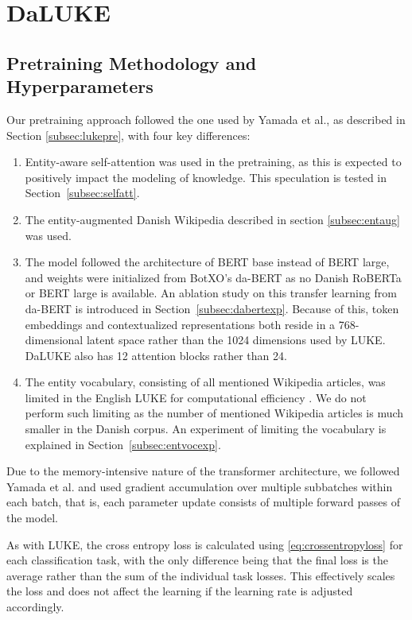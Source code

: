 \documentclass[main.tex]{subfiles}
\begin{document}
\section{DaLUKE}

\subsection{Pretraining Methodology and Hyperparameters}%
\label{sub:dalpre}
Our pretraining approach followed the one used by Yamada et al., as described in Section \ref{subsec:lukepre}, with four key differences:
\begin{enumerate}
    \item
        Entity-aware self-attention was used in the pretraining, as this is expected to positively impact the modeling of knowledge.
        This speculation is tested in Section~\ref{subsec:selfatt}.
    \item
        The entity-augmented Danish Wikipedia described in section \ref{subsec:entaug} was used.
    \item
        The model followed the architecture of BERT base instead of BERT large, and weights were initialized from BotXO's da-BERT \cite{botxo2019dabert} as no Danish RoBERTa or BERT large is available.
        An ablation study on this transfer learning from da-BERT is introduced in Section~\ref{subsec:dabertexp}.
        Because of this, token embeddings and contextualized representations both reside in a 768-dimensional latent space rather than the 1024 dimensions used by LUKE.
        DaLUKE also has 12 attention blocks rather than 24.
        \cite[Sec. 3.4]{yamada2020luke}
    \item
        The entity vocabulary, consisting of all mentioned Wikipedia articles, was limited in the English LUKE for computational efficiency \cite[Sec. 3.4]{yamada2020luke}.
        We do not perform such limiting as the number of mentioned Wikipedia articles is much smaller in the Danish corpus.
        An experiment of limiting the vocabulary is explained in Section~\ref{subsec:entvocexp}.
\end{enumerate}
Due to the memory-intensive nature of the transformer architecture, we followed Yamada et al. and used gradient accumulation over multiple subbatches within each batch, that is, each parameter update consists of multiple forward passes of the model.

As with LUKE, the cross entropy loss is calculated using \eqref{eq:crossentropyloss} for each classification task, with the only difference being that the final loss is the average rather than the sum of the individual task losses.
This effectively scales the loss and does not affect the learning if the learning rate is adjusted accordingly.
\end{document}
